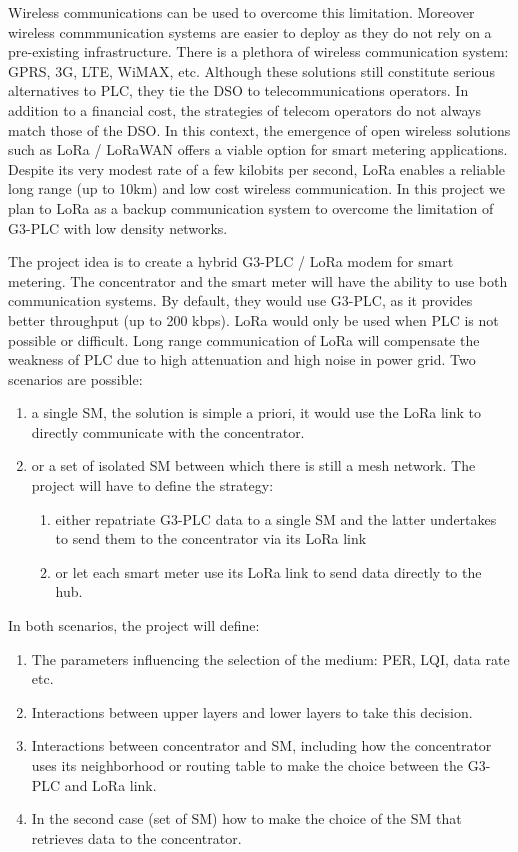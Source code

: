 \documentclass[a4paper,10pt]{article}
\begin{document}
Wireless communications can be used to overcome this
limitation. Moreover wireless commmunication systems are
easier to deploy as they do not rely on a pre-existing
infrastructure. There is a plethora of wireless
communication system: GPRS, 3G, LTE, WiMAX, etc. Although
these solutions still constitute serious alternatives to
PLC, they tie the DSO to telecommunications operators. In
addition to a financial cost, the strategies of telecom
operators do not always match those of the DSO. In this
context, the emergence of open wireless solutions such as
LoRa / LoRaWAN offers a viable option for smart metering
applications. Despite its very modest rate of a few kilobits
per second, LoRa enables a reliable long range (up to 10km)
and low cost wireless communication. In this project we plan
to LoRa as a backup communication system to overcome the
limitation of G3-PLC with low density networks.

The project idea is to create a hybrid G3-PLC / LoRa modem
for smart metering. The concentrator and the smart meter
will have the ability to use both communication systems. By
default, they would use G3-PLC, as it provides better
throughput (up to 200 kbps). LoRa would only be used when
PLC is not possible or difficult. Long range communication
of LoRa will compensate the weakness of PLC due to high
attenuation and high noise in power grid. Two scenarios are
possible:

\begin{enumerate}
  \itemsep -0.5em
  \item a single SM, the solution is simple a priori, it would use the LoRa link to directly communicate with the concentrator.
  \item or a set of isolated SM between which there is still a mesh network. The project will have to define the strategy:
    \begin{enumerate}
      \itemsep -0.5em
      \item either repatriate G3-PLC data to a single SM and the latter undertakes to send them to the concentrator via its LoRa link
      \item or let each smart meter use its LoRa link to send data directly to the hub.
    \end{enumerate}
\end{enumerate}

In both scenarios, the project will define:

\begin{enumerate}
  \itemsep -0.5em
  \item The parameters influencing the selection of the medium: PER, LQI, data rate etc.
  \item Interactions between upper layers and lower layers to take this decision.
  \item Interactions between concentrator and SM, including how the concentrator uses its neighborhood or routing table to make the choice between the G3-PLC and LoRa link.
  \item In the second case (set of SM) how to make the choice of the SM that retrieves data to the concentrator.
\end{enumerate}
\end{document}
